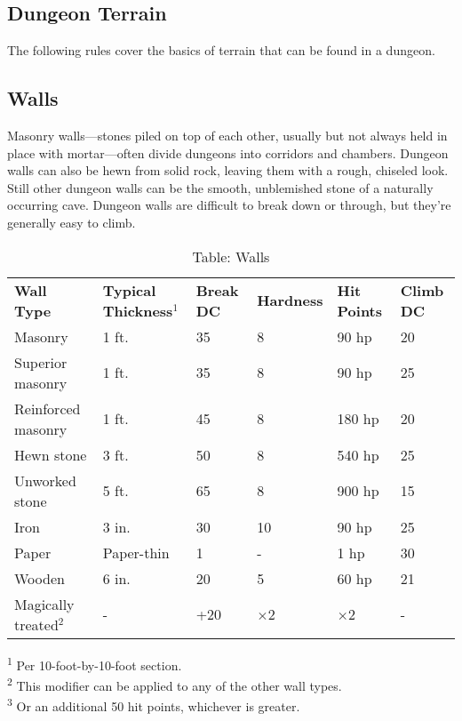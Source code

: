 \subsection{Dungeon Terrain}

				
The following rules cover the basics of terrain that can be found in a dungeon.
				
\subsection{Walls}

				
Masonry walls---stones piled on top of each other, usually but not always held in place with mortar---often divide dungeons into corridors and chambers. Dungeon walls can also be hewn from solid rock, leaving them with a rough, chiseled look. Still other dungeon walls can be the smooth, unblemished stone of a naturally occurring cave. Dungeon walls are difficult to break down or through, but they're generally easy to climb.

\begin{table*}[]
\sffamily
\caption{Table: Walls}
\begin{tabularx}{\linewidth}{Xlllll}
\textbf{Wall Type} & \textbf{Typical Thickness\(^{1}\)} & \textbf{Break DC} & \textbf{Hardness} & \textbf{Hit Points} & \textbf{Climb DC}\\
Masonry & 1 ft. & 35 & 8 & 90 hp & 20\\
Superior masonry & 1 ft. & 35 & 8 & 90 hp & 25\\
Reinforced masonry & 1 ft. & 45 & 8 & 180 hp & 20\\
Hewn stone & 3 ft. & 50 & 8 & 540 hp & 25\\
Unworked stone & 5 ft. & 65 & 8 & 900 hp & 15\\
Iron & 3 in. & 30 & 10 & 90 hp & 25\\
Paper & Paper-thin & 1 & - & 1 hp & 30\\
Wooden & 6 in. & 20 & 5 & 60 hp & 21\\
Magically treated\(^{2}\) & - & +20 & \mbox{$\times$}2 & \mbox{$\times$}2 & -\\
\end{tabularx}
\textsuperscript{1} Per 10-foot-by-10-foot section.\\
\textsuperscript{2} This modifier can be applied to any of the other wall types.\\
\textsuperscript{3} Or an additional 50 hit points, whichever is greater.\\
\end{table*}

